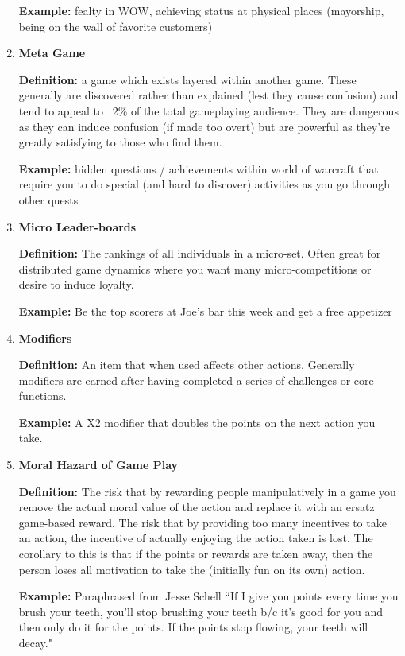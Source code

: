 \begin{enumerate}
\textbf{Example:} fealty in WOW, achieving status at physical places (mayorship, being on the wall of favorite customers)

\item \textbf{Meta Game}

\textbf{Definition:} a game which exists layered within another game. These generally are discovered rather than explained (lest they cause confusion) and tend to appeal to ~2\% of the total gameplaying audience. They are dangerous as they can induce confusion (if made too overt) but are powerful as they’re greatly satisfying to those who find them.

\textbf{Example:} hidden questions / achievements within world of warcraft that require you to do special (and hard to discover) activities as you go through other quests

\item \textbf{Micro Leader-boards}

\textbf{Definition:} The rankings of all individuals in a micro-set. Often great for distributed game dynamics where you want many micro-competitions or desire to induce loyalty.

\textbf{Example:} Be the top scorers at Joe’s bar this week and get a free appetizer

\item \textbf{Modifiers}

\textbf{Definition:} An item that when used affects other actions. Generally modifiers are earned after having completed a series of challenges or core functions.

\textbf{Example:} A X2 modifier that doubles the points on the next action you take.

\item \textbf{Moral Hazard of Game Play}

\textbf{Definition:} The risk that by rewarding people manipulatively in a game you remove the actual moral value of the action and replace it with an ersatz game-based reward. The risk that by providing too many incentives to take an action, the incentive of actually enjoying the action taken is lost. The corollary to this is that if the points or rewards are taken away, then the person loses all motivation to take the (initially fun on its own) action.

\textbf{Example:} Paraphrased from Jesse Schell ``If I give you points every time you brush your teeth, you’ll stop brushing your teeth b/c it’s good for you and then only do it for the points. If the points stop flowing, your teeth will decay."


\end{enumerate}
